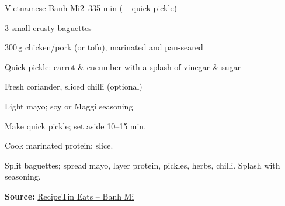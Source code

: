 \begin{recipebox}{Vietnamese Banh Mi}{2--3}{35 min (+ quick pickle)}
\begin{ingredients}
  \item 3 small crusty baguettes
  \item 300\,g chicken/pork (or tofu), marinated and pan-seared
  \item Quick pickle: carrot \& cucumber with a splash of vinegar \& sugar
  \item Fresh coriander, sliced chilli (optional)
  \item Light mayo; soy or Maggi seasoning
\end{ingredients}
\begin{method}
  \item Make quick pickle; set aside 10--15 min.
  \item Cook marinated protein; slice.
  \item Split baguettes; spread mayo, layer protein, pickles, herbs, chilli. Splash with seasoning.
\end{method}
\textbf{Source:} \href{https://www.recipetineats.com/banh-mi-vietnamese-sandwich/}{RecipeTin Eats – Banh Mi}
\end{recipebox}
